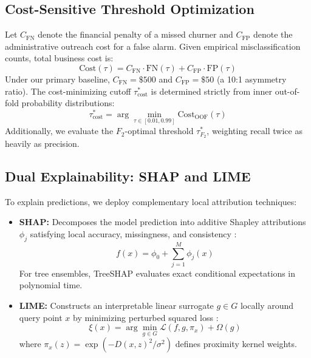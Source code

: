 \documentclass[conference]{IEEEtran}
\begin{document}
\subsection{Cost-Sensitive Threshold Optimization}
Let $C_{\text{FN}}$ denote the financial penalty of a missed churner and $C_{\text{FP}}$ denote the administrative outreach cost for a false alarm. Given empirical misclassification counts, total business cost is:
\begin{equation}
    \text{Cost}(\tau) = C_{\text{FN}} \cdot \text{FN}(\tau) + C_{\text{FP}} \cdot \text{FP}(\tau)
\end{equation}
Under our primary baseline, $C_{\text{FN}} = \$500$ and $C_{\text{FP}} = \$50$ (a 10:1 asymmetry ratio). The cost-minimizing cutoff $\tau^*_{\text{cost}}$ is determined strictly from inner out-of-fold probability distributions:
\begin{equation}
    \tau^*_{\text{cost}} = \arg\min_{\tau \in [0.01, 0.99]} \text{Cost}_{\text{OOF}}(\tau)
\end{equation}
Additionally, we evaluate the $F_2$-optimal threshold $\tau^*_{F_2}$, weighting recall twice as heavily as precision.

\subsection{Dual Explainability: SHAP and LIME}
To explain predictions, we deploy complementary local attribution techniques:
\begin{itemize}
    \item \textbf{SHAP:} Decomposes the model prediction into additive Shapley attributions $\phi_j$ satisfying local accuracy, missingness, and consistency \cite{lundberg2017unified}:
    \begin{equation}
        f(x) = \phi_0 + \sum_{j=1}^{M} \phi_j(x)
    \end{equation}
    For tree ensembles, TreeSHAP evaluates exact conditional expectations in polynomial time.
    \item \textbf{LIME:} Constructs an interpretable linear surrogate $g \in G$ locally around query point $x$ by minimizing perturbed squared loss \cite{ribeiro2016why}:
    \begin{equation}
        \xi(x) = \arg\min_{g \in G} \mathcal{L}(f, g, \pi_x) + \Omega(g)
    \end{equation}
    where $\pi_x(z) = \exp(-D(x,z)^2 / \sigma^2)$ defines proximity kernel weights.
\end{itemize}
\end{document}
